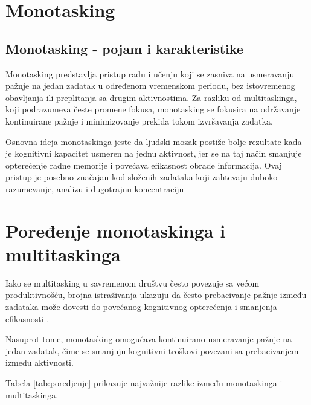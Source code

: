 \documentclass[12pt,a4paper]{article}
\begin{document}
\section{Monotasking}

\subsection{Monotasking - pojam i karakteristike}

Monotasking predstavlja pristup radu i učenju koji se zasniva na usmeravanju pažnje na jedan zadatak u određenom vremenskom periodu, bez istovremenog obavljanja ili preplitanja sa drugim aktivnostima. Za razliku od multitaskinga, koji podrazumeva česte promene fokusa, monotasking se fokusira na održavanje kontinuirane pažnje i minimizovanje prekida tokom izvršavanja zadatka.

Osnovna ideja monotaskinga jeste da ljudski mozak postiže bolje rezultate kada je kognitivni kapacitet usmeren na jednu aktivnost, jer se na taj način smanjuje opterećenje radne memorije i povećava efikasnost obrade informacija. Ovaj pristup je posebno značajan kod složenih zadataka koji zahtevaju duboko razumevanje, analizu i dugotrajnu koncentraciju


\section{Poređenje monotaskinga i multitaskinga}

Iako se multitasking u savremenom društvu često povezuje sa većom produktivnošću, brojna istraživanja ukazuju da često prebacivanje pažnje između zadataka može dovesti do povećanog kognitivnog opterećenja i smanjenja efikasnosti \cite{ophir2009, rubinstein2001}. 

Nasuprot tome, monotasking omogućava kontinuirano usmeravanje pažnje na jedan zadatak, čime se smanjuju kognitivni troškovi povezani sa prebacivanjem između aktivnosti.

Tabela \ref{tab:poredjenje} prikazuje najvažnije razlike između monotaskinga i multitaskinga.
\end{document}
